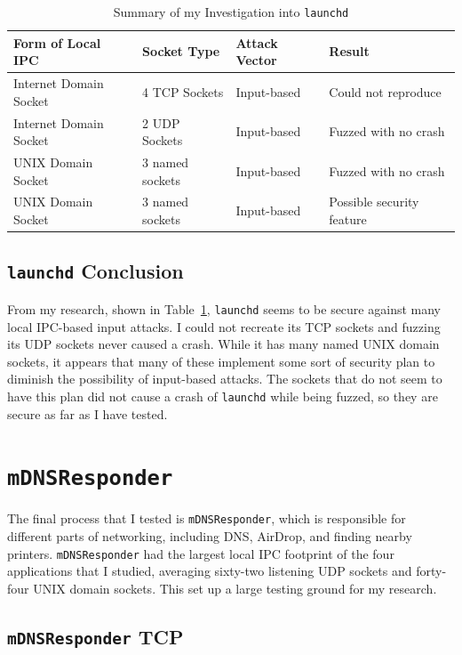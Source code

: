 \begin{table}
\centering
\begin{scriptsize}
\begin{tabular}{ l | l | l | l }
\textbf{Form of Local IPC} & \textbf{Socket Type} & \textbf{Attack Vector} & \textbf{Result} \\ \hline
Internet Domain Socket & 4 TCP Sockets & Input-based & Could not reproduce \\ \hline
Internet Domain Socket & 2 UDP Sockets & Input-based & Fuzzed with no crash \\ \hline
UNIX Domain Socket & 3 named sockets & Input-based & Fuzzed with no crash \\ \hline
UNIX Domain Socket & 3 named sockets & Input-based & Possible security feature \\ \hline
\end{tabular}
\caption{Summary of my Investigation into \texttt{launchd}}
\label{tab:launchdData}
\end{scriptsize}
\end{table} 

\subsection{\texttt{launchd} Conclusion}
\label{sec:launchdConclusion}
From my research, shown in Table~\ref{tab:launchdData}, \texttt{launchd} seems to be secure against many local IPC-based input attacks.  I could not recreate its TCP sockets and fuzzing its UDP sockets never caused a crash.  While it has many named UNIX domain sockets, it appears that many of these implement some sort of security plan to diminish the possibility of input-based attacks.  The sockets that do not seem to have this plan did not cause a crash of \texttt{launchd} while being fuzzed, so they are secure as far as I have tested.

\section{\texttt{mDNSResponder}}
\label{sec:mdns}
The final process that I tested is \texttt{mDNSResponder}, which is responsible for different parts of networking, including DNS, AirDrop, and finding nearby printers.  \texttt{mDNSResponder} had the largest local IPC footprint of the four applications that I studied, averaging sixty-two listening UDP sockets and forty-four UNIX domain sockets.  This set up a large testing ground for my research.

\subsection{\texttt{mDNSResponder} TCP}
\label{sec:mdnsTcp}

